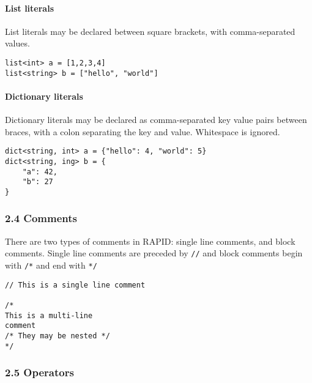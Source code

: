 \paragraph{List literals}\label{list-literals}

List literals may be declared between square brackets, with
comma-separated values.

\begin{verbatim}
list<int> a = [1,2,3,4]
list<string> b = ["hello", "world"]
\end{verbatim}

\paragraph{Dictionary literals}\label{dictionary-literals}

Dictionary literals may be declared as comma-separated key value pairs
between braces, with a colon separating the key and value. Whitespace is
ignored.

\begin{verbatim}
dict<string, int> a = {"hello": 4, "world": 5}
dict<string, ing> b = {
    "a": 42,
    "b": 27
}
\end{verbatim}

\subsubsection*{2.4 Comments}\label{comments}

There are two types of comments in RAPID: single line comments, and
block comments. Single line comments are preceded by \texttt{//} and
block comments begin with \texttt{/*} and end with \texttt{*/}

\begin{verbatim}
// This is a single line comment

/*
This is a multi-line
comment
/* They may be nested */
*/
\end{verbatim}

\subsubsection*{2.5 Operators}\label{operators}

